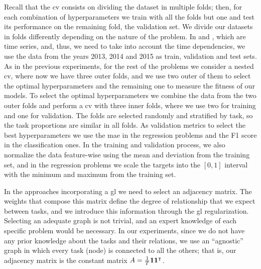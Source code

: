 Recall that the \acrshort{cv} consists on dividing the dataset in multiple folds; then, for each combination of hyperparameters we train with all the folds but one and test its performance on the remaining fold, the validation set. We divide our datasets in folds differently depending on the nature of the problem.
In  and , which are time series, and, thus, we need to take into account the time dependencies, we use the data from the years 2013, 2014 and 2015 as train, validation and test sets.
%
As in the previous experiments, for the rest of the problems we consider a nested \acrshort{cv}, where now we have three outer folds, and we use two outer of them to select the optimal hyperparameters and the remaining one to measure the fitness of our models. To select the optimal hyperparameters we combine the data from the two outer folds and perform a \acrshort{cv} with three inner folds, where we use two for training and one for validation.
The folds are selected randomly and stratified by task, so the task proportions are similar in all folds.
As validation metrics to select the best hyperparameters we use the \acrshort{mae} in the regression problems and the F1 score in the classification ones.
In the training and validation process, we also normalize the data feature-wise using the mean and deviation from the training set, and in the regression problems we scale the targets into the $[0, 1]$ interval with the minimum and maximum from the training set.

In the approaches incorporating a \acrshort{gl} we need to select an adjacency matrix. The weights that compose this matrix define the degree of relationship that we expect between tasks, and we introduce this information through the \acrshort{gl} regularization.
%
Selecting an adequate graph is not trivial, and an expert knowledge of each specific problem would be necessary. In our experiments, since we do not have any prior knowledge about the tasks and their relations, we use an ``agnostic'' graph in which every task (node) is connected to all the others; that is, our adjacency matrix is the constant matrix $A = \frac{1}{T} \bm{1} \bm{1}^\intercal$.


